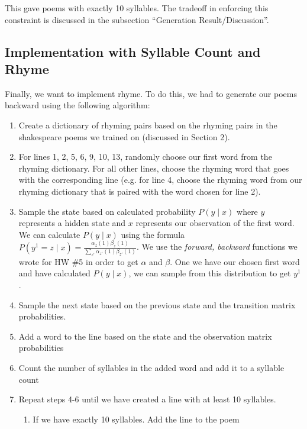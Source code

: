 This gave poems with exactly 10 syllables. The tradeoff in enforcing this constraint is discussed in the subsection ``Generation Result/Discussion''.

\subsection*{Implementation with Syllable Count and Rhyme}

Finally, we want to implement rhyme. To do this, we had to generate our poems backward using the following algorithm:

\begin{enumerate}

\item Create a dictionary of rhyming pairs based on the rhyming pairs in the shakespeare poems we trained on (discussed in Section 2). 

\item For lines 1, 2, 5, 6, 9, 10, 13, randomly choose our first word from the rhyming dictionary. For all other lines, choose the rhyming word that goes with the corresponding line (e.g. for line 4, choose the rhyming word from our rhyming dictionary that is paired with the word chosen for line 2). 

\item Sample the state based on calculated probability $P(y \mid x)$ where $y$ represents a hidden state and $x$ represents our observation of the first word. We can calculate $P(y \mid x)$ using the formula $P(y^1 = z \mid x) = \frac{\alpha_z(1) \beta_z(1)}{\sum_{z'} \alpha_{z'} (1) \beta_{z'}(1)}$. We use the \textit{forward, backward} functions we wrote for HW \#5 in order to get $\alpha$ and $\beta$. One we have our chosen first word and have calculated $P(y \mid x)$, we can sample from this distribution to get $y^1$.

\item Sample the next state based on the previous state and the transition matrix probabilities.

\item Add a word to the line based on the state and the observation matrix probabilities

\item Count the number of syllables in the added word and add it to a syllable count

\item Repeat steps 4-6 until we have created a line with at least 10 syllables. 

\begin{enumerate}
\item If we have exactly 10 syllables. Add the line to the poem


\end{enumerate}
\end{enumerate}
